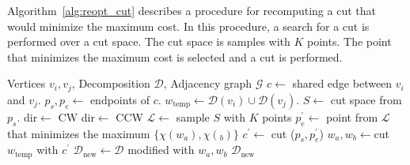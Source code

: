 \documentclass[../main.tex]{subfiles}
\begin{document}
Algorithm~\ref{alg:reopt_cut} describes a procedure for recomputing a cut that would minimize the maximum cost. In this procedure, a search for a cut is performed over a cut space. The cut space is samples with $K$ points. The point that minimizes the maximum cost is selected and a cut is performed.
\begin{algorithm}
	\caption{$\text{reopt\_cut}(v_i, v_j, \mathcal{D},\mathcal{G})$}
	\label{alg:reopt_cut}
	\begin{algorithmic}[1]
		\REQUIRE Vertices $v_i, v_j$, Decomposition $\mathcal{D}$, Adjacency graph $\mathcal{G}$
			\STATE $c\gets$ shared edge between $v_i$ and $v_j$.
			\STATE $p_s,p_e\gets$ endpoints of $c$.
			\STATE $w_{\text{temp}}\gets \mathcal{D}(v_i)\cup\mathcal{D}(v_j)$.
			\STATE $S\gets$ cut space from $p_s$.
				\STATE dir$\gets$ CW 
			\ELSE
				\STATE dir$\gets$ CCW
			\ENDIF			
			\STATE $\mathcal{L}\gets$ sample $S$ with $K$ points
			\STATE $p_e^{'}\gets$ point from $\mathcal{L}$ that minimizes the maximum $\{\chi(w_a),\chi(_b)\}$
			\STATE $c^{'}\gets$ cut ($p_s,p_e^{'}$)
			\STATE $w_a,w_b\gets$cut $w_{\text{temp}}$ with $c^{'}$
			\STATE $\mathcal{D}_{\text{new}}\gets\mathcal{D}$ modified with $w_a,w_b$
			\RETURN $\mathcal{D}_{\text{new}}$
%					

	\end{algorithmic}
\end{algorithm}
\end{document}
